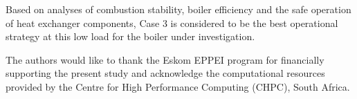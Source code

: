 \documentclass[11pt,cleanfoot]{asme2ej}
\begin{document}
Based on analyses of combustion stability, boiler efficiency and the safe operation of heat exchanger components, Case 3 is considered to be the best operational strategy at this low load for the boiler under investigation.
\begin{acknowledgment}
The authors would like to thank the Eskom EPPEI program for financially supporting the present study and acknowledge the computational resources provided by the Centre for High Performance Computing (CHPC), South Africa.
\end{acknowledgment}

%







\end{document}
